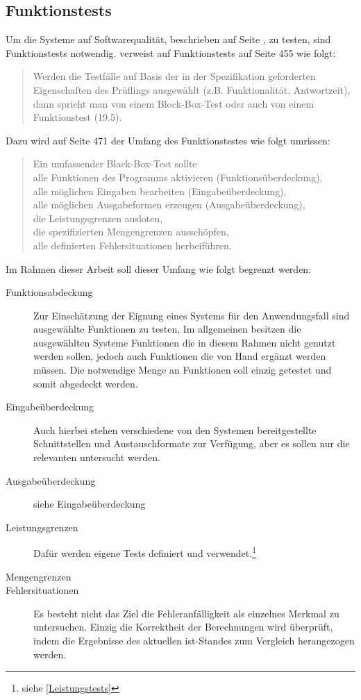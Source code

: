 \subsection{Funktionstests}
Um die Systeme auf Softwarequalität, beschrieben auf Seite \pageref{softwarequalität}, zu testen, sind Funktionstests notwendig.
\cite{book:softwareengineering} verweist auf Funktionstests auf Seite 455 wie folgt:
\begin{quote}
Werden die Testfälle auf Basis der in der Spezifikation geforderten Eigenschaften des Prüflings ausgewählt (z.B. Funktionalität, Antwortzeit), dann spricht man von einem Block-Box-Test oder auch von einem Funktionstest (19.5).
\end{quote}
Dazu wird auf Seite 471 der Umfang des Funktionstestes wie folgt umrissen:
\begin{quote}
Ein umfassender Black-Box-Test sollte\\
alle Funktionen des Programms aktivieren (Funktionsüberdeckung),\\
alle möglichen Eingaben bearbeiten (Eingabeüberdeckung),\\
alle möglichen Ausgabeformen erzeugen (Ausgabeüberdeckung),\\
die Leistungsgrenzen ausloten,\\
die spezifizierten Mengengrenzen ausschöpfen,\\
alle definierten Fehlersituationen herbeiführen.
\end{quote}
Im Rahmen dieser Arbeit soll dieser Umfang wie folgt begrenzt werden:
\begin{description}
\item[Funktionsabdeckung] Zur Einschätzung der Eignung eines Systems für den Anwendungsfall sind ausgewählte Funktionen zu testen, Im allgemeinen besitzen die ausgewählten Systeme Funktionen die in diesem Rahmen nicht genutzt werden sollen, jedoch auch Funktionen die von Hand ergänzt werden müssen. Die notwendige Menge an Funktionen soll einzig getestet und somit abgedeckt werden.
\item[Eingabeüberdeckung] Auch hierbei stehen verschiedene von den Systemen bereitgestellte Schnittstellen und Austauschformate zur Verfügung, aber es sollen nur die relevanten untersucht werden.
\item[Ausgabeüberdeckung] siehe Eingabeüberdeckung
\item[Leistungsgrenzen] Dafür werden eigene Tests definiert und verwendet.\footnote{siehe \ref{Leistungstests}}
\item[Mengengrenzen] 
\item[Fehlersituationen] Es besteht nicht das Ziel die Fehleranfälligkeit als einzelnes Merkmal zu untersuchen. Einzig die Korrektheit der Berechnungen wird überprüft, indem die Ergebnisse des aktuellen ist-Standes zum Vergleich herangezogen werden.
\end{description}

